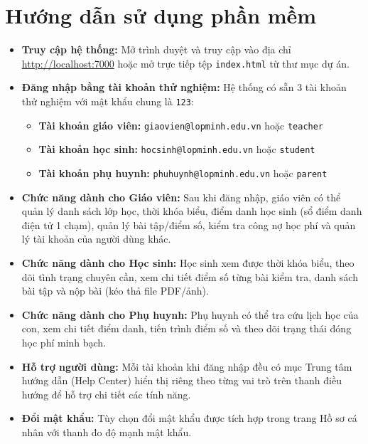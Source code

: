\section{Hướng dẫn sử dụng phần mềm}
\begin{itemize}
    \item \textbf{Truy cập hệ thống:} Mở trình duyệt và truy cập vào địa chỉ \url{http://localhost:7000} hoặc mở trực tiếp tệp \texttt{index.html} từ thư mục dự án.
    \item \textbf{Đăng nhập bằng tài khoản thử nghiệm:} Hệ thống có sẵn 3 tài khoản thử nghiệm với mật khẩu chung là \texttt{123}:
    \begin{itemize}
        \item \textbf{Tài khoản giáo viên:} \texttt{giaovien@lopminh.edu.vn} hoặc \texttt{teacher}
        \item \textbf{Tài khoản học sinh:} \texttt{hocsinh@lopminh.edu.vn} hoặc \texttt{student}
        \item \textbf{Tài khoản phụ huynh:} \texttt{phuhuynh@lopminh.edu.vn} hoặc \texttt{parent}
    \end{itemize}
    \item \textbf{Chức năng dành cho Giáo viên:} Sau khi đăng nhập, giáo viên có thể quản lý danh sách lớp học, thời khóa biểu, điểm danh học sinh (sổ điểm danh điện tử 1 chạm), quản lý bài tập/điểm số, kiểm tra công nợ học phí và quản lý tài khoản của người dùng khác.
    \item \textbf{Chức năng dành cho Học sinh:} Học sinh xem được thời khóa biểu, theo dõi tình trạng chuyên cần, xem chi tiết điểm số từng bài kiểm tra, danh sách bài tập và nộp bài (kéo thả file PDF/ảnh).
    \item \textbf{Chức năng dành cho Phụ huynh:} Phụ huynh có thể tra cứu lịch học của con, xem chi tiết điểm danh, tiến trình điểm số và theo dõi trạng thái đóng học phí minh bạch.
    \item \textbf{Hỗ trợ người dùng:} Mỗi tài khoản khi đăng nhập đều có mục Trung tâm hướng dẫn (Help Center) hiển thị riêng theo từng vai trò trên thanh điều hướng để hỗ trợ chi tiết các tính năng.
    \item \textbf{Đổi mật khẩu:} Tùy chọn đổi mật khẩu được tích hợp trong trang Hồ sơ cá nhân với thanh đo độ mạnh mật khẩu.
\end{itemize}

